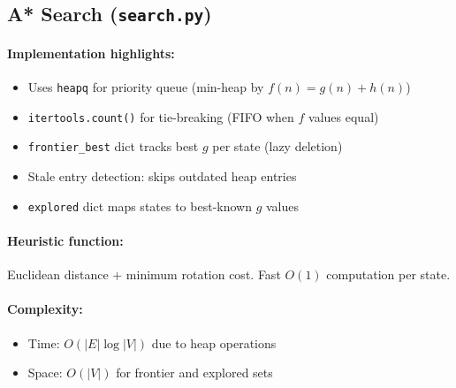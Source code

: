 \documentclass[11pt,a4paper]{article}
\begin{document}
\subsection{A* Search (\texttt{search.py})}
\paragraph{Implementation highlights:}
\begin{itemize}[leftmargin=1.5cm,itemsep=0.1em]
    \item Uses \texttt{heapq} for priority queue (min-heap by $f(n) = g(n) + h(n)$)
    \item \texttt{itertools.count()} for tie-breaking (FIFO when $f$ values equal)
    \item \texttt{frontier\_best} dict tracks best $g$ per state (lazy deletion)
    \item Stale entry detection: skips outdated heap entries
    \item \texttt{explored} dict maps states to best-known $g$ values
\end{itemize}

\paragraph{Heuristic function:}
Euclidean distance + minimum rotation cost. Fast $O(1)$ computation per state.

\paragraph{Complexity:}
\begin{itemize}[leftmargin=1.5cm,itemsep=0.1em]
    \item Time: $O(|E| \log |V|)$ due to heap operations
    \item Space: $O(|V|)$ for frontier and explored sets
\end{itemize}
\end{document}
